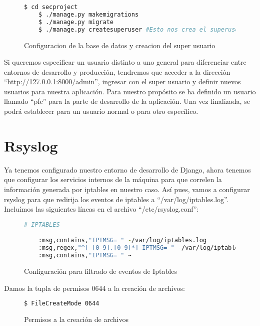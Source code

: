 \begin{figure}[H]
  \begin{lstlisting}[language=bash]
    $ cd secproject
    $ ./manage.py makemigrations
    $ ./manage.py migrate
    $ ./manage.py createsuperuser #Esto nos crea el superuser de administracion
  \end{lstlisting}
  \caption{Configuracion de la base de datos y creacion del super usuario}
\end{figure}

Si queremos especificar un usuario distinto a uno general para diferenciar entre entornos de desarrollo y producción, tendremos que acceder a la dirección ``http://127.0.0.1:8000/admin'', ingresar con el super usuario y definir nuevos usuarios para nuestra aplicación. Para nuestro propósito se ha definido un usuario llamado ``pfc'' para la parte de desarrollo de la aplicación. Una vez finalizada, se podrá establecer para un usuario normal o para otro específico.\\

\section{Rsyslog}

Ya tenemos configurado nuestro entorno de desarrollo de Django, ahora tenemos que configurar los servicios internos de la máquina para que correlen la información generada por iptables en nuestro caso. Así pues, vamos a configurar rsyslog para que redirija los eventos de iptables a ``/var/log/iptables.log''.\\

Incluímos las siguientes líneas en el archivo ``/etc/rsyslog.conf'':

\begin{figure}[H]
  \begin{lstlisting}[language=bash]
    # IPTABLES

    :msg,contains,"IPTMSG= " -/var/log/iptables.log
    :msg,regex,"^[ [0-9].[0-9]*] IPTMSG= " -/var/log/iptables.log
    :msg,contains,"IPTMSG= " ~
  \end{lstlisting}
  \caption{Configuración para filtrado de eventos de Iptables}
\end{figure}

Damos la tupla de permisos 0644 a la creación de archivos:

\begin{figure}[H]
  \begin{lstlisting}[language=bash]
   $ FileCreateMode 0644
  \end{lstlisting}
  \caption{Permisos a la creación de archivos}
\end{figure}

